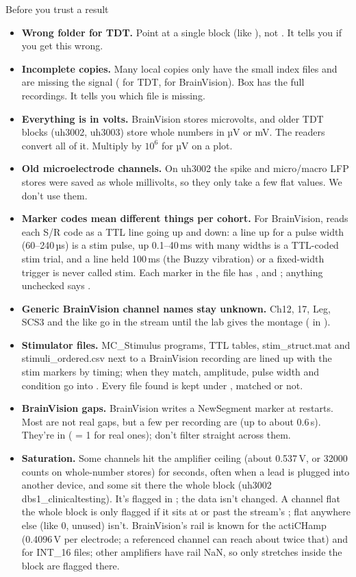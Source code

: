 \begin{careful}{Before you trust a result}
\begin{itemize}[topsep=0pt]
  \item \textbf{Wrong folder for TDT.} Point at a single block (like ), not . It tells you if you get this wrong.
  \item \textbf{Incomplete copies.} Many local copies only have the small index files and are missing the signal ( for TDT,  for BrainVision). Box has the full recordings. It tells you which file is missing.
  \item \textbf{Everything is in volts.} BrainVision stores microvolts, and older TDT blocks (uh3002, uh3003) store whole numbers in µV or mV. The readers convert all of it. Multiply by $10^6$ for µV on a plot.
  \item \textbf{Old microelectrode channels.} On uh3002 the spike and micro/macro LFP stores were saved as whole millivolts, so they only take a few flat values. We don't use them.
  \item \textbf{Marker codes mean different things per cohort.} For BrainVision,  reads each S/R code as a TTL line going up and down: a line up for a pulse width (60--240\,µs) is a stim pulse, up 0.1--40\,ms with many widths is a TTL-coded stim trial, and a line held 100\,ms (the Buzzy vibration) or a fixed-width trigger is never called stim. Each marker in the file has ,  and ; anything unchecked says .
  \item \textbf{Generic BrainVision channel names stay unknown.} Ch12, 17, Leg, SCS3 and the like go in the  stream until the lab gives the montage ( in ).
  \item \textbf{Stimulator files.} MC\_Stimulus programs, TTL tables, stim\_struct.mat and stimuli\_ordered.csv next to a BrainVision recording are lined up with the stim markers by timing; when they match, amplitude, pulse width and condition go into . Every file found is kept under , matched or not.
  \item \textbf{BrainVision gaps.} BrainVision writes a NewSegment marker at restarts. Most are not real gaps, but a few per recording are (up to about 0.6\,s). They're in  ( = 1 for real ones); don't filter straight across them.
  \item \textbf{Saturation.} Some channels hit the amplifier ceiling (about 0.537\,V, or 32000 counts on whole-number stores) for seconds, often when a lead is plugged into another device, and some sit there the whole block (uh3002 dbs1\_clinicaltesting). It's flagged in ; the data isn't changed. A channel flat the whole block is only flagged if it sits at or past the stream's ; flat anywhere else (like 0, unused) isn't. BrainVision's rail is known for the actiCHamp (0.4096\,V per electrode; a referenced channel can reach about twice that) and for INT\_16 files; other amplifiers have rail NaN, so only stretches inside the block are flagged there.

\end{itemize}
\end{careful}
